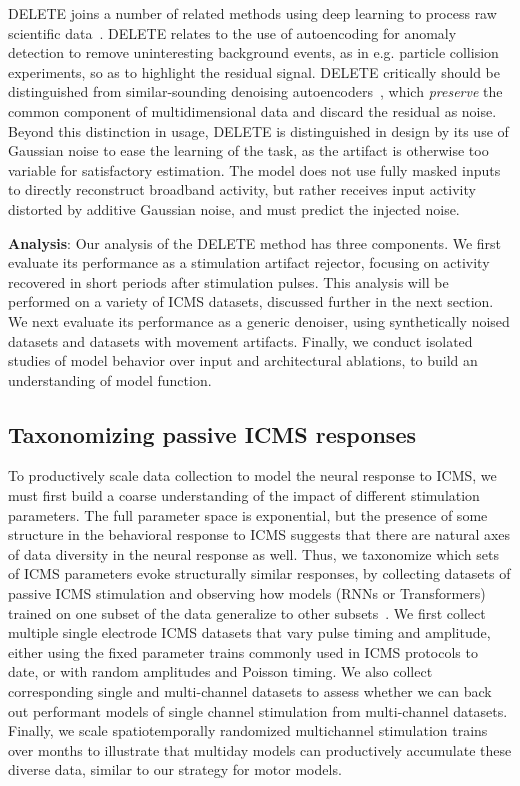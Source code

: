 \documentclass[12pt,oneside]{report}
\begin{document}
DELETE joins a number of related methods using deep learning to process raw scientific data~\citep{wang2023scientific}. DELETE relates to the use of autoencoding for anomaly detection to remove uninteresting background events, as in e.g. particle collision experiments, so as to highlight the residual signal. DELETE critically should be distinguished from similar-sounding denoising autoencoders~\citep{lecoq2021deepinterpolation,liu2025astro_denoise}, which \textit{preserve} the common component of multidimensional data and discard the residual as noise. Beyond this distinction in usage, DELETE is distinguished in design by its use of Gaussian noise to ease the learning of the task, as the artifact is otherwise too variable for satisfactory estimation. The model does not use fully masked inputs to directly reconstruct broadband activity, but rather receives input activity distorted by additive Gaussian noise, and must predict the injected noise.

\textbf{Analysis}: Our analysis of the DELETE method has three components. We first evaluate its performance as a stimulation artifact rejector, focusing on activity recovered in short periods after stimulation pulses. This analysis will be performed on a variety of ICMS datasets, discussed further in the next section. We next evaluate its performance as a generic denoiser, using synthetically noised datasets and datasets with movement artifacts. Finally, we conduct isolated studies of model behavior over input and architectural ablations, to build an understanding of model function.


\subsection*{Taxonomizing passive ICMS responses}
To productively scale data collection to model the neural response to ICMS, we must first build a coarse understanding of the impact of different stimulation parameters. The full parameter space is exponential, but the presence of some structure in the behavioral response to ICMS suggests that there are natural axes of data diversity in the neural response as well. Thus, we taxonomize which sets of ICMS parameters evoke structurally similar responses, by collecting datasets of passive ICMS stimulation and observing how models (RNNs or Transformers) trained on one subset of the data generalize to other subsets~\citep{zamir2018taskonomy}. We first collect multiple single electrode ICMS datasets that vary pulse timing and amplitude, either using the fixed parameter trains commonly used in ICMS protocols to date, or with random amplitudes and Poisson timing. We also collect corresponding single and multi-channel datasets to assess whether we can back out performant models of single channel stimulation from multi-channel datasets. Finally, we scale spatiotemporally randomized multichannel stimulation trains over months to illustrate that multiday models can productively accumulate these diverse data, similar to our strategy for motor models.
\end{document}
